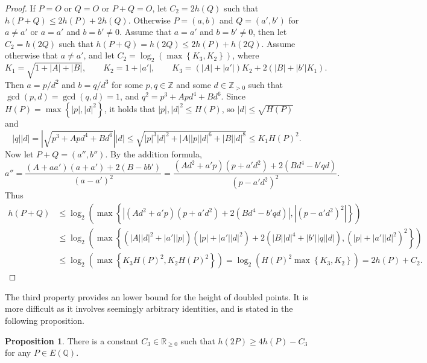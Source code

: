 \documentclass{article}
\newcommand{\Z}{\mathbb{Z}}
\newcommand{\Q}{\mathbb{Q}}
\newcommand{\R}{\mathbb{R}}
\newcommand{\rb}[1]{\left( #1 \right)}
\newcommand{\cb}[1]{\left\{ #1 \right\}}
\newcommand{\abs}[1]{\left\lvert #1 \right\rvert}
\theoremstyle{definition}\newtheorem*{definition}{Definition}
\theoremstyle{definition}\newtheorem*{example}{Example}
\theoremstyle{definition}\newtheorem*{remark}{Remark}
\newtheorem{proposition}{Proposition}[subsection]
\begin{document}
\begin{proof}
If $ P = O $ or $ Q = O $ or $ P + Q = O $, let $ C_2 = 2h\rb{Q} $ such that $ h\rb{P + Q} \le 2h\rb{P} + 2h\rb{Q} $. Otherwise $ P = \rb{a, b} $ and $ Q = \rb{a', b'} $ for $ a \ne a' $ or $ a = a' $ and $ b = b' \ne 0 $. Assume that $ a = a' $ and $ b = b' \ne 0 $, then let $ C_2 = h\rb{2Q} $ such that $ h\rb{P + Q} = h\rb{2Q} \le 2h\rb{P} + h\rb{2Q} $. Assume otherwise that $ a \ne a' $, and let $ C_2 = \log_2\rb{\max\cb{K_3, K_2}} $, where
$$ K_1 = \sqrt{1 + \abs{A} + \abs{B}}, \qquad K_2 = 1 + \abs{a'}, \qquad K_3 = \rb{\abs{A} + \abs{a'}}K_2 + 2\rb{\abs{B} + \abs{b'}K_1}. $$
Then $ a = p / d^2 $ and $ b = q / d^3 $ for some $ p, q \in \Z $ and some $ d \in \Z_{> 0} $ such that $ \gcd\rb{p, d} = \gcd\rb{q, d} = 1 $, and $ q^2 = p^3 + Apd^4 + Bd^6 $. Since $ H\rb{P} = \max\cb{\abs{p}, \abs{d}^2} $, it holds that $ \abs{p}, \abs{d}^2 \le H\rb{P} $, so $ \abs{d} \le \sqrt{H\rb{P}} $ and
$$ \abs{q}\abs{d} = \abs{\sqrt{p^3 + Apd^4 + Bd^6}}\abs{d} \le \sqrt{\abs{p}^3\abs{d}^2 + \abs{A}\abs{p}\abs{d}^6 + \abs{B}\abs{d}^8} \le K_1H\rb{P}^2. $$
Now let $ P + Q = \rb{a'', b''} $. By the addition formula,
$$ a'' = \dfrac{\rb{A + aa'}\rb{a + a'} + 2\rb{B - bb'}}{\rb{a - a'}^2} = \dfrac{\rb{Ad^2 + a'p}\rb{p + a'd^2} + 2\rb{Bd^4 - b'qd}}{\rb{p - a'd^2}^2}. $$
Thus
\begin{align*}
h\rb{P + Q}
& \le \log_2\rb{\max\cb{\abs{\rb{Ad^2 + a'p}\rb{p + a'd^2} + 2\rb{Bd^4 - b'qd}}, \abs{\rb{p - a'd^2}^2}}} \\
& \le \log_2\rb{\max\cb{\rb{\abs{A}\abs{d}^2 + \abs{a'}\abs{p}}\rb{\abs{p} + \abs{a'}\abs{d}^2} + 2\rb{\abs{B}\abs{d}^4 + \abs{b'}\abs{q}\abs{d}}, \rb{\abs{p} + \abs{a'}\abs{d}^2}^2}} \\
& \le \log_2\rb{\max\cb{K_3H\rb{P}^2, K_2H\rb{P}^2}}
= \log_2\rb{H\rb{P}^2\max\cb{K_3, K_2}}
= 2h\rb{P} + C_2.
\end{align*}
\end{proof}

\pagebreak

The third property provides an lower bound for the height of doubled points. It is more difficult as it involves seemingly arbitrary identities, and is stated in the following proposition.

\begin{proposition}
\label{prop:lowerbound}
There is a constant $ C_3 \in \R_{\ge 0} $ such that $ h\rb{2P} \ge 4h\rb{P} - C_3 $ for any $ P \in E\rb{\Q} $.
\end{proposition}
\end{document}
